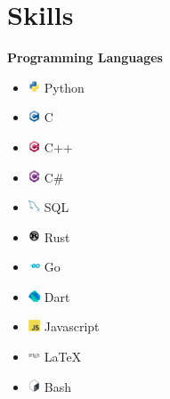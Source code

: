\documentclass{article}
\begin{document}
\section*{Skills}
\begin{multicols}{3}

\textbf{Programming Languages}
\begin{itemize}
    \item \includegraphics[height=10pt]{images/icons/python.png} Python
    \item \includegraphics[height=10pt]{images/icons/c.png} C
    \item \includegraphics[height=10pt]{images/icons/cpp.png} C++
    \item \includegraphics[height=10pt]{images/icons/csharp.png} C\#
    \item \includegraphics[height=10pt]{images/icons/mysql-original.png} SQL
    \item \includegraphics[height=10pt]{images/icons/rust-plain.png} Rust
    \item \includegraphics[height=10pt]{images/icons/go-original-wordmark.png} Go
    \item \includegraphics[height=10pt]{images/icons/dart.png} Dart
    \item \includegraphics[height=10pt]{images/icons/javascript-original} Javascript
    \item \includegraphics[height=10pt]{images/icons/latex-original.png} LaTeX
    \item \includegraphics[height=10pt]{images/icons/bash-original.png} Bash
\end{itemize}


\end{multicols}
\end{document}

